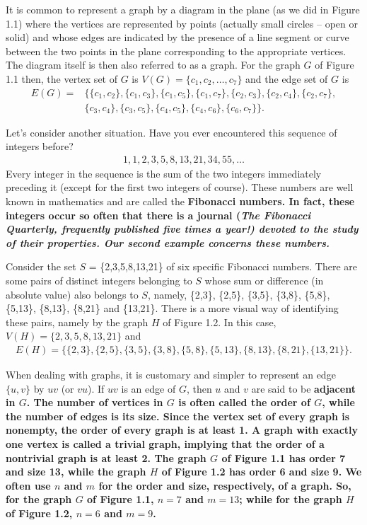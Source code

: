 It is common to represent a graph by a diagram in the plane (as we did in Figure 1.1) where the vertices are represented by points (actually small circles -- open or solid) and whose edges are indicated by the presence of a line segment or curve between the two points in the plane corresponding to the appropriate vertices. The diagram itself is then also referred to as a graph. For the graph $G$ of Figure 1.1 then, the vertex set of $G$ is $V(G) = \{c_{1},c_{2},\ldots,c_{7}\}$ and the edge set of $G$ is
\begin{align*}
E(G) = &\{\{c_{1},c_{2}\},\{c_{1},c_{3}\},\{c_{1},c_{5}\},\{c_{1},c_{7}\},\{c_{2},c_{3}\},\{c_{2},c_{4}\},\{c_{2},c_{7}\},\\
&\{c_{3},c_{4}\},\{c_{3},c_{5}\},\{c_{4},c_{5}\},\{c_{4},c_{6}\},\{c_{6},c_{7}\}\}.
\end{align*}

Let's consider another situation. Have you ever encountered this sequence of integers before?
\begin{align*}
1, 1, 2, 3, 5, 8, 13, 21, 34, 55, \ldots
\end{align*}
Every integer in the sequence is the sum of the two integers immediately preceding it (except for the first two integers of course). These numbers are well known in mathematics and are called the \bf{Fibonacci numbers}. In fact, these integers occur so often that there is a journal (\it{The Fibonacci Quarterly}, frequently published \it{five} times a year!) devoted to the study of their properties. Our second example concerns these numbers.

\begin{exmp}
Consider the set $S$ = \{2,3,5,8,13,21\} of six specific Fibonacci numbers. There are some pairs of distinct integers belonging to $S$ whose sum or difference (in absolute value) also belongs to $S$, namely, \{2,3\}, \{2,5\}, \{3,5\}, \{3,8\}, \{5,8\}, \{5,13\}, \{8,13\}, \{8,21\} and \{13,21\}. There is a more visual way of identifying these pairs, namely by the graph $H$ of Figure 1.2. In this case, $V(H) = \{2,3,5,8,13,21\}$ and
\begin{align*}
E(H) = \{\{2,3\},\{2,5\},\{3,5\},\{3,8\},\{5,8\},\{5,13\},\{8,13\},\{8,21\},\{13,21\}\}.
\end{align*}
\end{exmp}



When dealing with graphs, it is customary and simpler to represent an edge $\{u,v\}$ by $uv$ (or $vu$). If $uv$ is an edge of $G$, then $u$ and $v$ are said to be \bf{adjacent} in $G$. The number of vertices in $G$ is often called the \bf{order} of $G$, while the number of edges is its \bf{size}. Since the vertex set of every graph is nonempty, the order of every graph is at least 1. A graph with exactly one vertex is called a \bf{trivial graph}, implying that the order of a \bf{nontrivial graph} is at least 2. The graph $G$ of Figure 1.1 has order 7 and size 13, while the graph $H$ of Figure 1.2 has order 6 and size 9. We often use $n$ and $m$ for the order and size, respectively, of a graph. So, for the graph $G$ of Figure 1.1, $n = 7$ and $m = 13$; while for the graph $H$ of Figure 1.2, $n = 6$ and $m = 9$.

